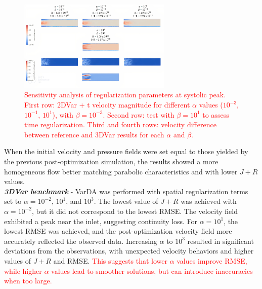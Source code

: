 \begin{figure}
    \centering
    \includegraphics[width=0.65\textwidth, height = 0.25\textheight]{chapters/chp1/graphics/01.07_pt2.JPG}
    \caption{\textcolor{red}{Sensitivity analysis of regularization parameters at systolic peak. First row: 2DVar + t velocity magnitude for different $\alpha$ values ($10^{-3}$, $10^{-1}$, $10^{1}$), with $\beta = 10^{-3}$. Second row: test with $\beta = 10^{1}$ to assess time regularization. Third and fourth rows: velocity difference between reference and 3DVar results for each $\alpha$ and $\beta$.}}
    \label{fig:3.3}
\end{figure}

When the initial velocity and pressure fields were set equal to those yielded by the previous post-optimization simulation, the results showed a more homogeneous flow better matching parabolic characteristics and with lower \(J + R\) values.\\

\textbf{\textit{3DVar benchmark}} - VarDA was performed with spatial regularization terms set to $\alpha = 10^{-2}$, $10^1$, and $10^3$. The lowest value of $J + R$ was achieved with $\alpha = 10^{-2}$, but it did not correspond to the lowest RMSE. The velocity field exhibited a peak near the inlet, suggesting continuity loss. For $\alpha = 10^1$, the lowest RMSE was achieved, and the post-optimization velocity field more accurately reflected the observed data. Increasing $\alpha$ to $10^3$ resulted in significant deviations from the observations, with unexpected velocity behaviors and higher values of $J + R$ and RMSE. \textcolor{red}{This suggests that lower $\alpha$ values improve RMSE, while higher $\alpha$ values lead to smoother solutions, but can introduce inaccuracies when too large.}\\

